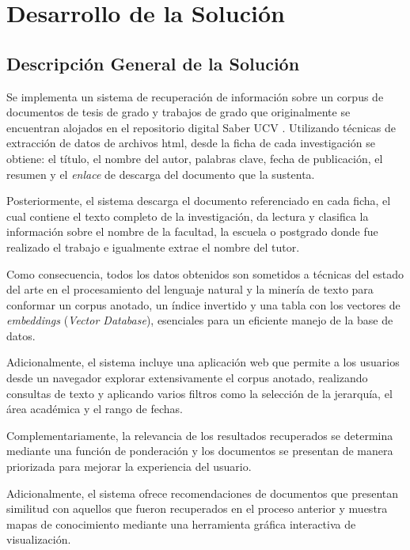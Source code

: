 \documentclass[
  12pt,
  openany]{book}
\begin{document}
\hypertarget{desarrollo}{%
\chapter{Desarrollo de la Solución}\label{desarrollo}}

\hypertarget{desarollodescripcion}{%
\section{Descripción General de la Solución}\label{desarollodescripcion}}

Se implementa un sistema de recuperación de información sobre un corpus de documentos de tesis de grado y trabajos de grado que originalmente se encuentran alojados en el repositorio digital Saber UCV . Utilizando técnicas de extracción de datos de archivos html, desde la ficha de cada investigación se obtiene: el título, el nombre del autor, palabras clave, fecha de publicación, el resumen y el \emph{enlace} de descarga del documento que la sustenta.

Posteriormente, el sistema descarga el documento referenciado en cada ficha, el cual contiene el texto completo de la investigación, da lectura y clasifica la información sobre el nombre de la facultad, la escuela o postgrado donde fue realizado el trabajo e igualmente extrae el nombre del tutor.

Como consecuencia, todos los datos obtenidos son sometidos a técnicas del estado del arte en el procesamiento del lenguaje natural y la minería de texto para conformar un corpus anotado, un índice invertido y una tabla con los vectores de \emph{embeddings} (\emph{Vector Database}), esenciales para un eficiente manejo de la base de datos.

Adicionalmente, el sistema incluye una aplicación web que permite a los usuarios desde un navegador explorar extensivamente el corpus anotado, realizando consultas de texto y aplicando varios filtros como la selección de la jerarquía, el área académica y el rango de fechas.

Complementariamente, la relevancia de los resultados recuperados se determina mediante una función de ponderación y los documentos se presentan de manera priorizada para mejorar la experiencia del usuario.

Adicionalmente, el sistema ofrece recomendaciones de documentos que presentan similitud con aquellos que fueron recuperados en el proceso anterior y muestra mapas de conocimiento mediante una herramienta gráfica interactiva de visualización.
\end{document}
